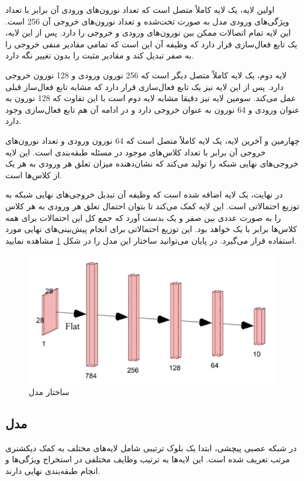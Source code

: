 اولین لایه، یک لایه کاملاً متصل است که تعداد نورون‌های ورودی آن برابر با تعداد ویژگی‌های ورودی مدل به صورت تخت‌شده%
و تعداد نورون‌های خروجی آن 256 است. این لایه تمام اتصالات ممکن بین نورون‌های ورودی و خروجی را دارد. پس از این لایه، یک تابع فعال‌سازی 
قرار دارد که وظیفه آن این است که تمامی مقادیر منفی خروجی را به صفر تبدیل کند و مقادیر مثبت را بدون تغییر نگه دارد.

لایه دوم، یک لایه کاملاً متصل دیگر است که 256 نورون ورودی و 128 نورون خروجی دارد. پس از این لایه نیز یک تابع فعال‌سازی
قرار دارد که مشابه تابع فعال‌ساز قبلی عمل می‌کند. سومین لایه نیز دقیقا مشابه لایه دوم است با این تفاوت که 128 نورون به عنوان ورودی و 64 نورون به عنوان خروجی دارد و در ادامه آن هم تابع فعال‌سازی
وجود دارد.

چهارمین و آخرین لایه، یک لایه کاملاً متصل است که 64 نورون ورودی و تعداد نورون‌های خروجی آن برابر با تعداد کلاس‌های موجود در مسئله طبقه‌بندی است. این لایه خروجی‌های نهایی شبکه را تولید می‌کند که نشان‌دهنده میزان تعلق هر ورودی به هر یک از کلاس‌ها است.

در نهایت، یک لایه 
اضافه شده است که وظیفه آن تبدیل خروجی‌های نهایی شبکه به توزیع احتمالاتی است. این لایه کمک می‌کند تا بتوان احتمال تعلق هر ورودی به هر کلاس را به صورت عددی بین صفر و یک بدست آورد که جمع کل این احتمالات برای همه کلاس‌ها برابر با یک خواهد بود. این توزیع احتمالاتی برای انجام پیش‌بینی‌های نهایی مورد استفاده قرار می‌گیرد. در پایان می‌توانید ساختار این مدل را در شکل
\ref{mlp}
مشاهده نمایید.

\begin{figure}[t]
	\centering
	\includegraphics[scale=0.7]{images/chap5/mlp.png}%
	\caption{
		ساختار مدل 
	}
	\label{mlp}
	\centering
\end{figure}



\subsection{
	مدل
}
در شبکه عصبی پیچشی، ابتدا یک بلوک ترتیبی شامل لایه‌های مختلف به کمک دیکشنری مرتب تعریف شده است. این لایه‌ها به ترتیب وظایف مختلفی در استخراج ویژگی‌ها و انجام طبقه‌بندی نهایی دارند.


